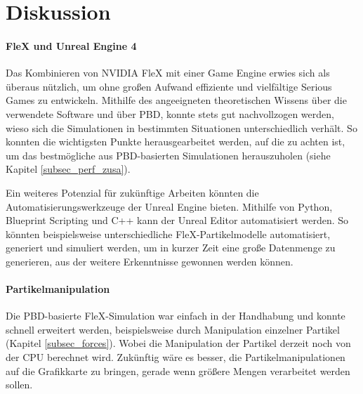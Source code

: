 \chapter{Diskussion}


\subsubsection{FleX und Unreal Engine 4}
Das Kombinieren von NVIDIA FleX mit einer Game Engine erwies sich als überaus nützlich, um ohne großen Aufwand effiziente und vielfältige Serious Games zu entwickeln. 
Mithilfe des angeeigneten theoretischen Wissens über die verwendete Software und über PBD, konnte stets gut nachvollzogen werden, wieso sich die Simulationen in bestimmten Situationen unterschiedlich verhält. 
So konnten die wichtigsten Punkte herausgearbeitet werden, auf die zu achten ist, um das bestmögliche aus PBD-basierten Simulationen herauszuholen (siehe Kapitel \ref{subsec_perf_zusa}).


Ein weiteres Potenzial für zukünftige Arbeiten könnten die Automatisierungswerkzeuge der Unreal Engine bieten. Mithilfe von Python, Blueprint Scripting und C++ kann der Unreal Editor automatisiert werden. So könnten beispielsweise unterschiedliche FleX-Partikelmodelle automatisiert, generiert und simuliert werden, um in kurzer Zeit eine große Datenmenge zu generieren, aus der weitere Erkenntnisse gewonnen werden können.

\subsubsection{Partikelmanipulation}
Die PBD-basierte FleX-Simulation war einfach in der Handhabung und konnte schnell erweitert werden, beispielsweise durch Manipulation einzelner Partikel (Kapitel \ref{subsec_forces}). Wobei die Manipulation der Partikel derzeit noch von der CPU berechnet wird. Zukünftig wäre es besser, die Partikelmanipulationen auf die Grafikkarte zu bringen, gerade wenn größere Mengen verarbeitet werden sollen. 

